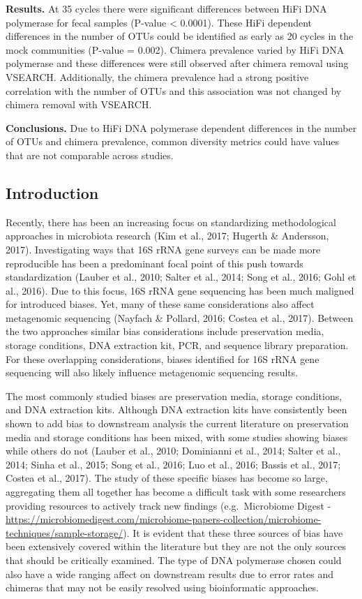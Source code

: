 \documentclass[12pt,]{article}
\begin{document}
\textbf{Results.} At 35 cycles there were significant differences
between HiFi DNA polymerase for fecal samples (P-value \textless{}
0.0001). These HiFi dependent differences in the number of OTUs could be
identified as early as 20 cycles in the mock communities (P-value =
0.002). Chimera prevalence varied by HiFi DNA polymerase and these
differences were still observed after chimera removal using VSEARCH.
Additionally, the chimera prevalence had a strong positive correlation
with the number of OTUs and this association was not changed by chimera
removal with VSEARCH.

\textbf{Conclusions.} Due to HiFi DNA polymerase dependent differences
in the number of OTUs and chimera prevalence, common diversity metrics
could have values that are not comparable across studies.

\newpage

\subsection{Introduction}\label{introduction}

Recently, there has been an increasing focus on standardizing
methodological approaches in microbiota research (Kim et al., 2017;
Hugerth \& Andersson, 2017). Investigating ways that 16S rRNA gene
surveys can be made more reproducible has been a predominant focal point
of this push towards standardization (Lauber et al., 2010; Salter et
al., 2014; Song et al., 2016; Gohl et al., 2016). Due to this focus, 16S
rRNA gene sequencing has been much maligned for introduced biases. Yet,
many of these same considerations also affect metagenomic sequencing
(Nayfach \& Pollard, 2016; Costea et al., 2017). Between the two
approaches similar bias considerations include preservation media,
storage conditions, DNA extraction kit, PCR, and sequence library
preparation. For these overlapping considerations, biases identified for
16S rRNA gene sequencing will also likely influence metagenomic
sequencing results.

The most commonly studied biases are preservation media, storage
conditions, and DNA extraction kits. Although DNA extraction kits have
consistently been shown to add bias to downstream analysis the current
literature on preservation media and storage conditions has been mixed,
with some studies showing biases while others do not (Lauber et al.,
2010; Dominianni et al., 2014; Salter et al., 2014; Sinha et al., 2015;
Song et al., 2016; Luo et al., 2016; Bassis et al., 2017; Costea et al.,
2017). The study of these specific biases has become so large,
aggregating them all together has become a difficult task with some
researchers providing resources to actively track new findings
(e.g.~Microbiome Digest -
\url{https://microbiomedigest.com/microbiome-papers-collection/microbiome-techniques/sample-storage/}).
It is evident that these three sources of bias have been extensively
covered within the literature but they are not the only sources that
should be critically examined. The type of DNA polymerase chosen could
also have a wide ranging affect on downstream results due to error rates
and chimeras that may not be easily resolved using bioinformatic
approaches.
\end{document}
